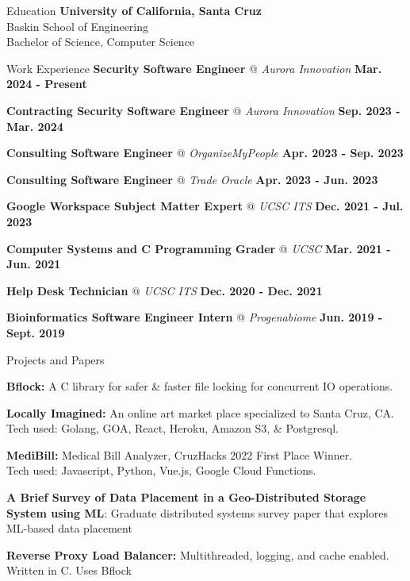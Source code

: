 \documentclass{resume} %
\begin{document}
\begin{rSection}{Education}
    \textbf{University of California, Santa Cruz}
    \\ Baskin School of Engineering
    \\ Bachelor of Science, Computer Science
\end{rSection}

\begin{rSection}{Work Experience}
    {\textbf{Security Software Engineer}} @ \textit{{Aurora Innovation}}
    \hfill{\textbf {Mar. 2024 - Present}}

    {\textbf{Contracting Security Software Engineer}} @ \textit{{Aurora Innovation}}
    \hfill{\textbf {Sep. 2023 - Mar. 2024}}

    {\textbf{Consulting Software Engineer} @ \textit{OrganizeMyPeople}}
    \hfill{\textbf {Apr. 2023 - Sep. 2023}}

    \textbf{Consulting Software Engineer} @  \textit{Trade Oracle}
    \hfill{\textbf {Apr. 2023 - Jun. 2023}}

    {\textbf{Google Workspace Subject Matter Expert} @ \textit{UCSC ITS} }
    \hfill{\textbf {Dec. 2021 - Jul. 2023}}

    {\textbf{Computer Systems and C Programming Grader} @ \textit{UCSC} }
    \hfill{\textbf {Mar. 2021 - Jun. 2021}}

    {\textbf{Help Desk Technician} @ \textit{UCSC ITS}}
    \hfill{\textbf {Dec. 2020 - Dec. 2021}}

    {\textbf{Bioinformatics Software Engineer Intern} @ \textit{Progenabiome}}
    \hfill{\textbf {Jun. 2019 - Sept. 2019}}
\end{rSection}

\begin{rSection}{Projects and Papers}

    {\textbf{Bflock:}} A C library for safer \& faster file locking for concurrent IO operations.

    {\textbf{Locally Imagined:}} An online art market place specialized to Santa Cruz, CA.
    \\ Tech used: Golang, GOA, React, Heroku, Amazon S3, \& Postgresql.
    
    {\textbf{MediBill:}} Medical Bill Analyzer, CruzHacks 2022 First Place Winner.
    \\Tech used: Javascript, Python, Vue.js, Google Cloud Functions.

    {\textbf{A Brief Survey of Data Placement in a Geo-Distributed Storage System using ML}: Graduate distributed systems survey paper that explores ML-based data placement} 

    {\textbf{Reverse Proxy Load Balancer:} } Multithreaded, logging, and cache enabled. Written in C. Uses Bflock
\end{rSection}
\end{document}
